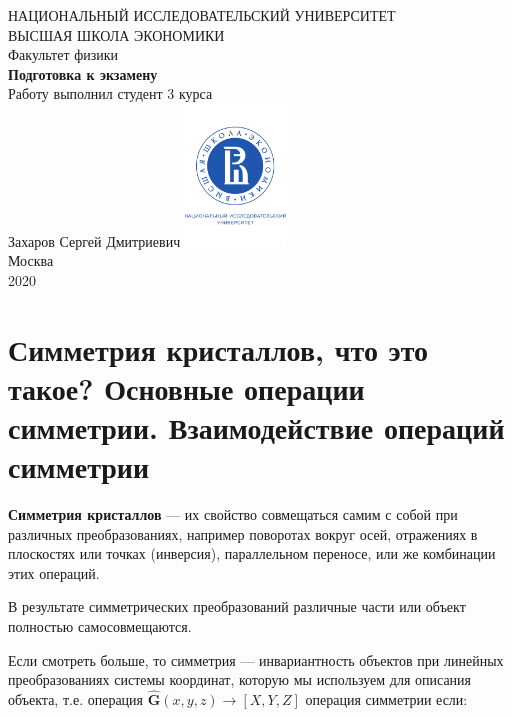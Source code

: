 \documentclass[a4paper, 12pt]{article}
\begin{document}
	\begin{titlepage}
		\begin{center}
			$$$$
			$$$$
			$$$$
			$$$$
			{\Large{НАЦИОНАЛЬНЫЙ ИССЛЕДОВАТЕЛЬСКИЙ УНИВЕРСИТЕТ}}\\
			\vspace{0.1cm}
			{\Large{ВЫСШАЯ ШКОЛА ЭКОНОМИКИ}}\\
			\vspace{0.25cm}
			{\large{Факультет физики}}\\
			\vspace{5.5cm}
			{\Huge\textbf{{Подготовка к экзамену}}}\\%
			\vspace{1cm}
			\vspace{2cm}
			{Работу выполнил студент 3 курса}\\
			{Захаров Сергей Дмитриевич}
			\vfill
			\includegraphics[width = 0.2\textwidth]{HSElogo}\\
			\vfill
			Москва\\
			2020
		\end{center}
	\end{titlepage}
	
\tableofcontents

\newpage

\section{Симметрия кристаллов, что это такое? Основные операции симметрии. Взаимодействие операций симметрии}

\textbf{Симметрия кристаллов} --- их свойство совмещаться самим с собой при различных преобразованиях, например поворотах вокруг осей, отражениях в плоскостях или точках (инверсия), параллельном переносе, или же комбинации этих операций.

В результате симметрических преобразований различные части или объект полностью самосовмещаются.

Если смотреть больше, то симметрия --- инвариантность объектов при линейных преобразованиях системы координат, которую мы используем для описания объекта, т.е. операция $\hat{\mathbf{G}}(x, y, z) \rightarrow [X, Y, Z]$ операция симметрии если:
\end{document}
